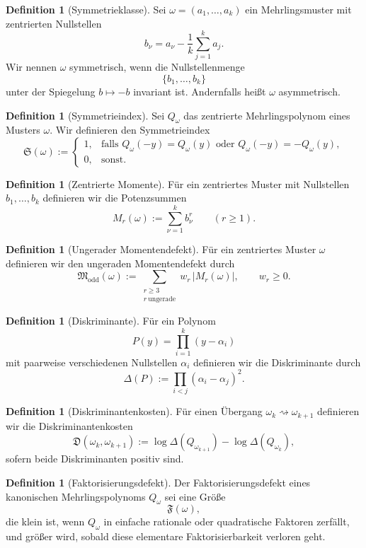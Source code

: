 \documentclass[11pt,a4paper]{article}
\theoremstyle{definition}
\newtheorem{definition}[satz]{Definition}
\begin{document}
\begin{definition}[Symmetrieklasse]
Sei \(\omega=(a_1,\dots,a_k)\) ein Mehrlingsmuster mit zentrierten Nullstellen
\[
b_\nu=a_\nu-\frac{1}{k}\sum_{j=1}^k a_j.
\]
Wir nennen \(\omega\) symmetrisch, wenn die Nullstellenmenge
\[
\{b_1,\dots,b_k\}
\]
unter der Spiegelung \(b\mapsto -b\) invariant ist. Andernfalls heißt \(\omega\) asymmetrisch.
\end{definition}

\begin{definition}[Symmetrieindex]
Sei \(Q_\omega\) das zentrierte Mehrlingspolynom eines Musters \(\omega\). Wir definieren den Symmetrieindex
\[
\mathfrak S(\omega):=
\begin{cases}
1,& \text{falls } Q_\omega(-y)=Q_\omega(y)\text{ oder }Q_\omega(-y)=-Q_\omega(y),\\
0,& \text{sonst.}
\end{cases}
\]
\end{definition}

\begin{definition}[Zentrierte Momente]
Für ein zentriertes Muster mit Nullstellen \(b_1,\dots,b_k\) definieren wir die Potenzsummen
\[
M_r(\omega):=\sum_{\nu=1}^k b_\nu^r
\qquad (r\ge 1).
\]
\end{definition}

\begin{definition}[Ungerader Momentendefekt]
Für ein zentriertes Muster \(\omega\) definieren wir den ungeraden Momentendefekt durch
\[
\mathfrak M_{\mathrm{odd}}(\omega)
:=
\sum_{\substack{r\ge 3\\ r\ \mathrm{ungerade}}}
w_r\,|M_r(\omega)|,
\qquad
w_r\ge 0.
\]
\end{definition}

\begin{definition}[Diskriminante]
Für ein Polynom
\[
P(y)=\prod_{i=1}^k (y-\alpha_i)
\]
mit paarweise verschiedenen Nullstellen \(\alpha_i\) definieren wir die Diskriminante durch
\[
\Delta(P):=\prod_{i<j}(\alpha_i-\alpha_j)^2.
\]
\end{definition}

\begin{definition}[Diskriminantenkosten]
Für einen Übergang \(\omega_k\rightsquigarrow\omega_{k+1}\) definieren wir die Diskriminantenkosten
\[
\mathfrak D(\omega_k,\omega_{k+1})
:=
\log \Delta(Q_{\omega_{k+1}})
-\log \Delta(Q_{\omega_k}),
\]
sofern beide Diskriminanten positiv sind.
\end{definition}

\begin{definition}[Faktorisierungsdefekt]
Der Faktorisierungsdefekt eines kanonischen Mehrlingspolynoms \(Q_\omega\) sei eine Größe
\[
\mathfrak F(\omega),
\]
die klein ist, wenn \(Q_\omega\) in einfache rationale oder quadratische Faktoren zerfällt, und größer wird, sobald diese elementare Faktorisierbarkeit verloren geht.
\end{definition}
\end{document}
